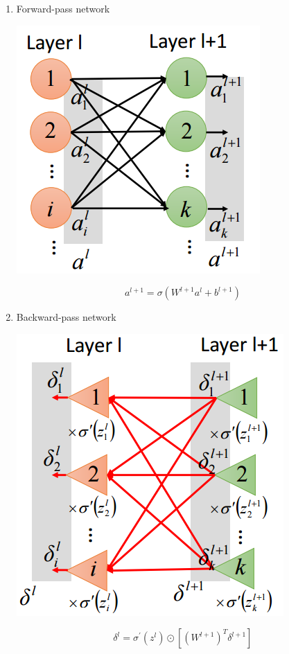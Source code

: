 \documentclass{article}
\begin{document}
\begin{enumerate}
\item
Forward-pass network
\begin{center}
\includegraphics[scale=0.4]{forward}
\end{center}
\[
a^{l+1} = \sigma(W^{l+1}a^l+b^{l+1})
\]
\item
Backward-pass network
\begin{center}
\includegraphics[scale=0.4]{backward}
\end{center}
\[
\delta^l = \sigma^\prime(z^l)\odot[(W^{l+1})^T\delta^{l+1}]
\]
\end{enumerate}
\end{document}
